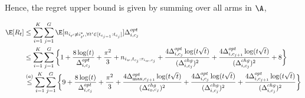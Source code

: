 \begin{customproof}{2}
%
%

Hence, the regret upper bound is given by summing over all arms in $\A$,

\begin{align*}
\E[R_t] &\leq \sum_{i=1}^{K}\sum_{j=1}^{G}\E[n_{i_{t'}\neq i^*_{t'} ,\forall t'\in[t_{c_{j-1}}:t_{c_j}]}]\Delta^{opt}_{i,c_j} \\
&\leq \sum_{i=1}^{K}\sum_{j=1}^{G} \bigg\lbrace 1 + \dfrac{8\log(t)}{\Delta^{opt}_{i,c_j}} + \dfrac{\pi^2}{3} + n_{i_w,t_{c_j}:\tau_{i_w,c_j}} + \dfrac{4\Delta^{opt}_{i,c_{j}}\log(t\sqrt{t})}{(\Delta^{chg}_{i,c_j})^2} +\dfrac{4\Delta^{opt}_{i,c_{j+1}}\log(t\sqrt{t})}{(\Delta^{chg}_{i,c_j})^{2}} + 8 \bigg\rbrace\\
& \overset{(a)}{\leq} \sum_{i=1}^{K}\sum_{j=1}^{G} \bigg\lbrace 9 + \dfrac{8\log(t)}{\Delta^{opt}_{i,c_j}} + \dfrac{\pi^2}{3} + \dfrac{4\Delta^{opt}_{\max,c_{j+1}}\log(t\sqrt{t})}{(\Delta^{chg}_{\epsilon_0,c_j})^{2}} + \dfrac{4\Delta^{opt}_{i,c_{j}}\log(t\sqrt{t})}{(\Delta^{chg}_{i,c_j})^2} + \dfrac{4\Delta^{opt}_{i,c_{j+1}}\log(t\sqrt{t})}{(\Delta^{chg}_{i,c_j})^{2}}\bigg\rbrace
\end{align*}


\end{customproof}
